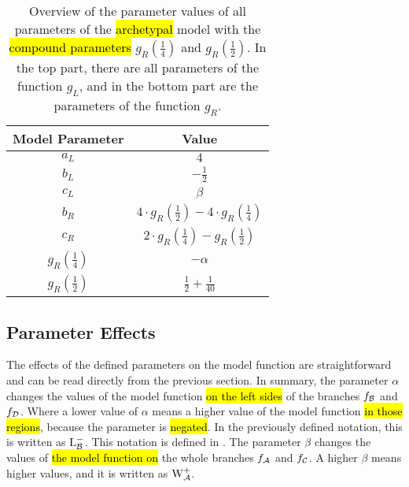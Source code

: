 \begin{table}
	\centering
	\begin{tabular}{|c|c|}
		\hline
		Model Parameter               & Value                                                                       \\ \hline \hline
		$a_L$                         & $4$                                                                         \\ \hline
		$b_L$                         & $-\frac{1}{2}$                                                              \\ \hline
		$c_L$                         & $\beta$                                                                     \\ \hline \hline
		$b_R$                         & $4 \cdot g_R\left(\frac{1}{2}\right) - 4 \cdot g_R\left(\frac{1}{4}\right)$ \\ \hline
		$c_R$                         & $2 \cdot g_R\left(\frac{1}{4}\right) - g_R\left(\frac{1}{2}\right)$         \\ \hline
		$g_R\left(\frac{1}{4}\right)$ & $-\alpha$                                                                   \\ \hline
		$g_R\left(\frac{1}{2}\right)$ & $\frac{1}{2} + \frac{1}{40}$                                                \\ \hline
	\end{tabular}
	\caption[Overview of parameters of the archetypal model]{
		Overview of the parameter values of all parameters of the \hl{archetypal} model with the \hl{compound parameters} $g_R\left(\frac{1}{4}\right)$ and $g_R\left(\frac{1}{2}\right)$.
		In the top part, there are all parameters of the function $g_L$, and in the bottom part are the parameters of the function $g_R$.
	}
	\label{table:setup.arch.parameters}
\end{table}

\subsection{Parameter Effects}
\label{sec:setup.arch.parameterfx}

The effects of the defined parameters on the model function are straightforward and can be read directly from the previous section.
In summary, the parameter $\alpha$ changes the values of the model function \hl{on the left sides} of the branches $f_{\mathcal{B}}$ and $f_{\mathcal{D}}$.
Where a lower value of $\alpha$ means a higher value of the model function \hl{in those regions}, because the parameter is \hl{negated}.
In the previously defined notation, this is written as $\operatorname{L}_{\mathcal{B}}^-$.
This notation is defined in .
The parameter $\beta$ changes the values of \hl{the model function on} the whole branches $f_{\mathcal{A}}$ and $f_{\mathcal{C}}$.
A higher $\beta$ means higher values, and it is written as $\operatorname{W}_{\mathcal{A}}^+$.


